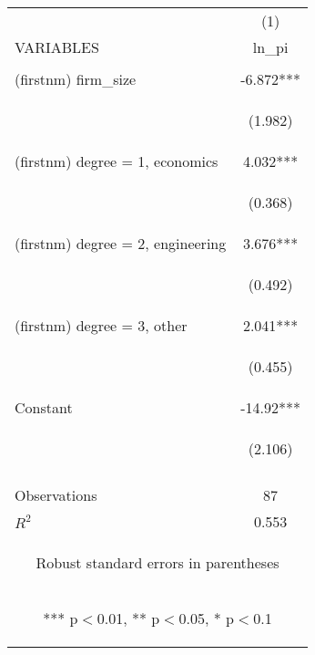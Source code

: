 \begin{center}
\begin{tabular}{lc} \hline
 & (1) \\
VARIABLES & ln\_pi \\ \hline
\vspace{4pt} & \begin{footnotesize}\end{footnotesize} \\
(firstnm) firm\_size & -6.872*** \\
\vspace{4pt} & \begin{footnotesize}(1.982)\end{footnotesize} \\
(firstnm) degree = 1, economics & 4.032*** \\
\vspace{4pt} & \begin{footnotesize}(0.368)\end{footnotesize} \\
(firstnm) degree = 2, engineering & 3.676*** \\
\vspace{4pt} & \begin{footnotesize}(0.492)\end{footnotesize} \\
(firstnm) degree = 3, other & 2.041*** \\
\vspace{4pt} & \begin{footnotesize}(0.455)\end{footnotesize} \\
Constant & -14.92*** \\
 & \begin{footnotesize}(2.106)\end{footnotesize} \\
\vspace{4pt} & \begin{footnotesize}\end{footnotesize} \\
Observations & 87 \\
 $R^2$ & 0.553 \\ \hline
\multicolumn{2}{c}{\begin{footnotesize} Robust standard errors in parentheses\end{footnotesize}} \\
\multicolumn{2}{c}{\begin{footnotesize} *** p$<$0.01, ** p$<$0.05, * p$<$0.1\end{footnotesize}} \\
\end{tabular}
\end{center}
